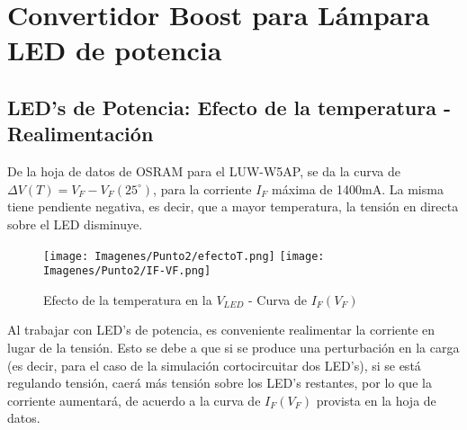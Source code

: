 \documentclass[e4_tp2_main.tex]{subfiles}
\begin{document}

\section{Convertidor Boost para Lámpara LED de potencia}

\subsection*{LED's de Potencia: Efecto de la temperatura - Realimentación}
De la hoja de datos de OSRAM para el LUW-W5AP, se da la curva de $\Delta V(T)=V_F-V_F(25^{\circ})$, para la corriente $I_F$ máxima de 1400mA. La misma tiene pendiente negativa, es decir, que a mayor temperatura, la tensión en directa sobre el LED disminuye.

\begin{figure}[H]
\centering
\texttt{[image: Imagenes/Punto2/efectoT.png]}
\texttt{[image: Imagenes/Punto2/IF-VF.png]}
\caption{Efecto de la temperatura en la $V_{LED}$ - Curva de $I_F(V_F)$}
\end{figure}

Al trabajar con LED's de potencia, es conveniente realimentar la corriente en lugar de la tensión. Esto se debe a que si se produce una perturbación en la carga (es decir, para el caso de la simulación cortocircuitar dos LED's), si se está regulando tensión, caerá más tensión sobre los LED's restantes, por lo que la corriente aumentará, de acuerdo a la curva de $I_F(V_F)$ provista en la hoja de datos.
\end{document}
